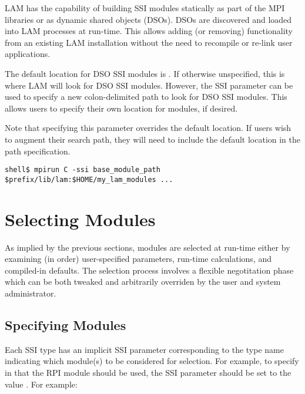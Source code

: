 
LAM has the capability of building SSI modules statically as part of
the MPI libraries or as dynamic shared objects (DSOs).  DSOs are
discovered and loaded into LAM processes at run-time.  This allows
adding (or removing) functionality from an existing LAM installation
without the need to recompile or re-link user applications.

The default location for DSO SSI modules is .
If otherwise unspecified, this is where LAM will look for DSO SSI
modules.  However, the SSI parameter
 can be used to specify a new
colon-delimited path to look for DSO SSI modules.  This allows users
to specify their own location for modules, if desired.

Note that specifying this parameter overrides the default location.
If users wish to augment their search path, they will need to include
the default location in the path specification.

\lstset{style=lam-cmdline}
\begin{lstlisting}
shell$ mpirun C -ssi base_module_path $prefix/lib/lam:$HOME/my_lam_modules ...
\end{lstlisting}



\section{Selecting Modules}

As implied by the previous sections, modules are selected at run-time
either by examining (in order) user-specified parameters, run-time
calculations, and compiled-in defaults.  The selection process
involves a flexible negotitation phase which can be both tweaked and
arbitrarily overriden by the user and system administrator.


\subsection{Specifying Modules}

Each SSI type has an implicit SSI parameter corresponding to the type
name indicating which module(s) to be considered for selection.  For
example, to specify in that the  RPI module should be used,
the SSI parameter  should be set to the value
.  For example:

